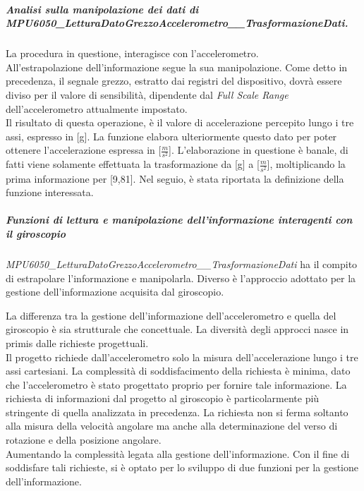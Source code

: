 \documentclass[11pt]{report}
\begin{document}
\subparagraph{Analisi sulla manipolazione dei dati di\\MPU6050\_LetturaDatoGrezzoAccelerometro\_\_TrasformazioneDati.}
La procedura in questione, interagisce con l'accelerometro.\\
All'estrapolazione dell'informazione segue la sua manipolazione. Come detto in precedenza, il segnale grezzo, estratto dai registri del dispositivo, dovrà essere diviso per il valore di sensibilità, dipendente dal \textit{Full Scale Range} dell'accelerometro attualmente impostato.\\
Il risultato di questa operazione, è il valore di accelerazione percepito lungo i tre assi, espresso in [g]. La funzione elabora ulteriormente questo dato per poter ottenere l'accelerazione espressa in [$\frac{m}{s^2}$]. L'elaborazione in questione è banale, di fatti viene solamente effettuata la trasformazione da [g] a [$\frac{m}{s^2}$], moltiplicando la prima informazione per [9,81].
Nel seguio, è stata riportata la definizione della funzione interessata.


\subparagraph{Funzioni di lettura e manipolazione dell'informazione interagenti con il giroscopio}
\textit{MPU6050\_LetturaDatoGrezzoAccelerometro\_\_TrasformazioneDati} ha il compito di estrapolare l'informazione e manipolarla. Diverso è l'approccio adottato per la gestione dell'informazione acquisita dal giroscopio.

La differenza tra la gestione dell'informazione dell'accelerometro e quella del giroscopio è sia strutturale che concettuale. La diversità degli approcci nasce in primis dalle richieste progettuali.\\
Il progetto richiede dall'accelerometro solo la misura dell'accelerazione lungo i tre assi cartesiani. La complessità di soddisfacimento della richiesta è minima, dato che l'accelerometro è stato progettato proprio per fornire tale informazione.
La richiesta di informazioni dal progetto al giroscopio è particolarmente più stringente di quella analizzata in precedenza. La richiesta non si ferma soltanto alla misura della velocità angolare ma anche alla determinazione del verso di rotazione e della posizione angolare.\\
Aumentando la complessità legata alla gestione dell'informazione.
Con il fine di soddisfare tali richieste, si è optato per lo sviluppo di due funzioni per la gestione dell'informazione.
\end{document}
